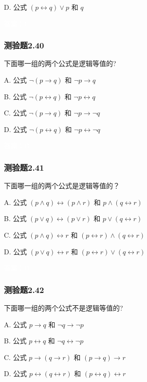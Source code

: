 \documentclass[UTF8, heading=true]{ctexart}
\begin{document}
D. 公式 $(p \leftrightarrow q) \vee p$ 和 $q$

\textcolor{white}{答案：C}

\subsubsection{测验题2.40}

下面哪一组的两个公式是逻辑等值的?

A. 公式 $\neg(p \rightarrow q)$ 和 $\neg p \rightarrow q$

B. 公式 $\neg(p \leftrightarrow q)$ 和 $\neg p \leftrightarrow q$

C. 公式 $\neg(p \rightarrow q)$ 和 $\neg p \rightarrow \neg q$

D. 公式 $\neg(p \leftrightarrow q)$ 和 $\neg p \leftrightarrow \neg q$

\textcolor{white}{答案：B}



\subsubsection{测验题2.41}

下面哪一组的两个公式是逻辑等值的？

A. 公式 $(p \wedge q) \leftrightarrow(p \wedge r)$ 和 $p \wedge(q \leftrightarrow r)$

B. 公式 $(p \vee q) \leftrightarrow(p \vee r)$ 和 $p \vee(q \leftrightarrow r)$

C. 公式 $(p \wedge q) \leftrightarrow r$ 和 $(p \leftrightarrow r) \wedge(q \leftrightarrow r)$

D. 公式 $(p \vee q) \leftrightarrow r$ 和 $(p \leftrightarrow r) \vee(q \leftrightarrow r)$

\textcolor{white}{答案：B}

\subsubsection{测验题2.42}

下面哪一组的两个公式不是逻辑等值的?

A. 公式 $p \rightarrow q$ 和 $\neg q \rightarrow \neg p$

B.  公式 $p \leftrightarrow q$ 和 $\neg q \leftrightarrow \neg p$

C. 公式 $p \rightarrow(q \rightarrow r)$ 和 $(p \rightarrow q) \rightarrow r$

D. 公式 $p \leftrightarrow(q \leftrightarrow r)$ 和 $(p \leftrightarrow q) \leftrightarrow r$
\end{document}
